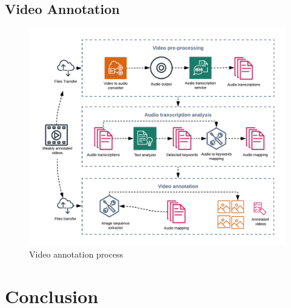 \documentclass[twocolumn]{article}
\begin{document}
\subsection{Video Annotation}\label{videoannot}
\begin{figure}[ht!]
\includegraphics[width=\linewidth]{video-annotation-pipeline.png}
\caption{Video annotation process}
\end{figure}
\section{Conclusion}\label{conclusion}



\end{document}
